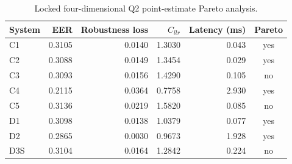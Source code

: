 \begin{table}[t]
\centering
\small
\caption{Locked four-dimensional Q2 point-estimate Pareto analysis.}
\label{tab:v1-q2-pareto}
\begin{tabular}{lrrrrc}
\toprule
System & EER & Robustness loss & $C_{llr}$ & Latency (ms) & Pareto \\
\midrule
C1 & 0.3105 & 0.0140 & 1.3030 & 0.043 & yes \\
C2 & 0.3088 & 0.0149 & 1.3454 & 0.029 & yes \\
C3 & 0.3093 & 0.0156 & 1.4290 & 0.105 & no \\
C4 & 0.2115 & 0.0364 & 0.7758 & 2.930 & yes \\
C5 & 0.3136 & 0.0219 & 1.5820 & 0.085 & no \\
D1 & 0.3098 & 0.0138 & 1.0379 & 0.077 & yes \\
D2 & 0.2865 & 0.0030 & 0.9673 & 1.928 & yes \\
D3S & 0.3104 & 0.0164 & 1.2842 & 0.224 & no \\
\bottomrule
\end{tabular}
\end{table}
